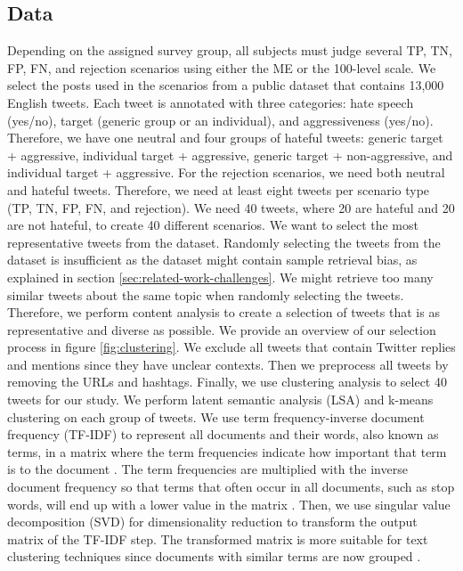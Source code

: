 \subsection{Data}
\label{sec:data}
Depending on the assigned survey group, all subjects must judge several TP, TN, FP, FN, and rejection scenarios using either the ME or the 100-level scale.
%
We select the posts used in the scenarios from a public dataset \citep{basile2019semeval} that contains 13,000 English tweets.
%
Each tweet is annotated with three categories: hate speech (yes/no), target (generic group or an individual), and aggressiveness (yes/no).
%
Therefore, we have one neutral and four groups of hateful tweets: generic target + aggressive, individual target + aggressive, generic target + non-aggressive, and individual target + aggressive.
%
For the rejection scenarios, we need both neutral and hateful tweets.
%
Therefore, we need at least eight tweets per scenario type (TP, TN, FP, FN, and rejection).
%
We need 40 tweets, where 20 are hateful and 20 are not hateful, to create 40 different scenarios.
%
We want to select the most representative tweets from the dataset.
%
Randomly selecting the tweets from the dataset is insufficient as the dataset might contain sample retrieval bias, as explained in section \ref{sec:related-work-challenges}.
%
We might retrieve too many similar tweets about the same topic when randomly selecting the tweets.
%
Therefore, we perform content analysis to create a selection of tweets that is as representative and diverse as possible.
%
We provide an overview of our selection process in figure \ref{fig:clustering}.
%
We exclude all tweets that contain Twitter replies and mentions since  they have unclear contexts.
%
Then we preprocess all tweets by removing the URLs and hashtags.
%
Finally, we use clustering analysis to select 40 tweets for our study.
%
We perform latent semantic analysis (LSA) and k-means clustering on each group of tweets.
%
We use term frequency-inverse document frequency (TF-IDF) to represent all documents and their words, also known as terms, in a matrix where the term frequencies indicate how important that term is to the document \citep{aggarwal2012survey}.
%
The term frequencies are multiplied with the inverse document frequency so that terms that often occur in all documents, such as stop words, will end up with a lower value in the matrix \citep{aggarwal2012survey}.
%
Then, we use singular value decomposition (SVD) for dimensionality reduction to transform the output matrix of the TF-IDF step.
%
The transformed matrix is more suitable for text clustering techniques since documents with similar terms are now grouped \citep{aggarwal2012survey}.
